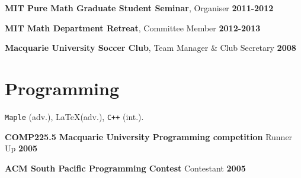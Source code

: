 \documentclass[margin,line]{resume}
\newcommand{\award}[3]{\textbf{#1} #2 \hfill \textbf{#3}
           
\vspace{-2.3mm}}
\begin{document}
\begin{resume}
\textbf{MIT Pure Math Graduate Student Seminar}, Organiser \hfill \textbf{2011-2012}

\vspace{-2mm}
         \textbf{MIT Math Department Retreat},     {Committee Member} \hfill \textbf{2012-2013}

\vspace{-2mm}
         \textbf{Macquarie University Soccer Club},     {Team Manager \& Club Secretary} \hfill \textbf{2008}
%
%






%   
%    
% 






    \section{\mysidestyle Programming} 

\texttt{Maple} (adv.), \LaTeX (adv.), \texttt{C++} (int.).

\vspace{-1.5mm}

\award{COMP225.5 Macquarie University Programming competition}{Runner Up}{2005}
\award{ACM South Pacific Programming Contest}{Contestant}{2005}
%





\end{resume}
\end{document}

